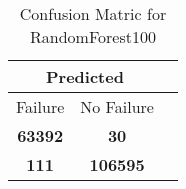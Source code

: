 \begin{table}[] 
\caption{Confusion Matric for RandomForest100} 
\label{Table: Prediction Accuracy-NoneRandomForest100100.0EKF-ignoresolarPanelDipole-solarPanelDipole} 
\centering 
\begin{tabular} 
 {@{}ccc@{}} 
\toprule 
\multicolumn{2}{c}{\textbf{Predicted}}
 \\ \midrule 
\multicolumn{1}{|c|}{Failure} & 
\multicolumn{1}{c|}{No Failure}
 \\ \midrule 
\multicolumn{1}{|c|}{\color{green}\textbf{63392}} & 
\multicolumn{1}{c|}{\color{red}\textbf{30}}
 \\ \midrule 
\multicolumn{1}{|c|}{\color{red}\textbf{111}} & 
\multicolumn{1}{c|}{\color{green}\textbf{106595}}
 \\ \bottomrule 
\end{tabular} 
\end{table} 
